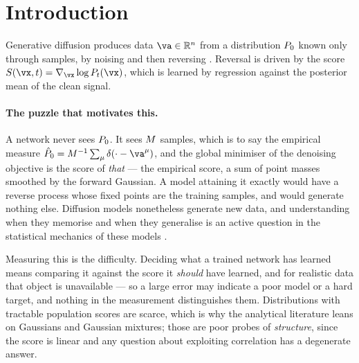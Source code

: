 \documentclass{article}
\begin{document}
\begin{abstract}
Against networks trained by denoising score matching on identical data, with the optimisation
budget of \emph{both} arms selected on a held-out bundle, the structured estimator attains between
\ratioloword{} and \ratiohisubword{} times lower pointwise denoising error across \nsizessub{}
training-set sizes, and the network at the largest budget does not reach what the estimator attains
at the smallest. The comparison is
deliberately asymmetric in prior information: the estimator is handed the Markov factorisation,
the autoregressive form and a low-dimensional innovation family, and the networks are handed none
of them. What it measures is therefore the worth of that structure on this family, not a general
ranking of the two approaches.
\end{abstract}

\section{Introduction}
\label{sec:intro}

Generative diffusion produces data $\va\in\Reals^{\nsites}$ from a distribution $P_0$ known only
through samples, by noising and then reversing \citep{sohl2015,ho2020,song2021}. Reversal is
driven by the score $\score(\vx,t)=\nabla_{\vx}\log\Pt(\vx)$, which is learned by regression
against the posterior mean of the clean signal.

\paragraph{The puzzle that motivates this.} A network never sees $P_0$. It sees $M$ samples,
which is to say the empirical measure $\hat P_0 = \nseq^{-1}\sum_\mu \delta(\cdot - \va^\mu)$, and
the global minimiser of the denoising objective is the score of \emph{that} --- the empirical
score, a sum of point masses smoothed by the forward Gaussian. A model attaining it exactly would
have a reverse process whose fixed points are the training samples, and would generate nothing
else. Diffusion models nonetheless generate new data, and understanding when they memorise and
when they generalise is an active question in the statistical mechanics of these models
\citep{biroli2023,biroli2024dynamical}.

Measuring this is the difficulty. Deciding what a trained network has learned means comparing it
against the score it \emph{should} have learned, and for realistic data that object is
unavailable --- so a large error may indicate a poor model or a hard target, and nothing in the
measurement distinguishes them. Distributions with tractable population scores are scarce, which
is why the analytical literature leans on Gaussians and Gaussian mixtures; those are poor probes
of \emph{structure}, since the score is linear and any question about exploiting correlation has a
degenerate answer.
\end{document}
